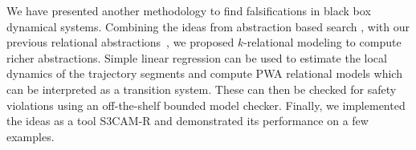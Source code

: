 
We have presented another methodology to find falsifications in black
box dynamical systems. Combining the ideas from abstraction based
search \cite{zutshi2014multiple}, with our previous relational
abstractions~\cite{zutshi2012timed}, we proposed $k$-relational
modeling to compute richer abstractions. Simple linear regression can
be used to estimate the local dynamics of the trajectory segments and
compute PWA relational models which can be interpreted as a transition
system.  These can then be checked for safety violations using an
off-the-shelf bounded model checker.  Finally, we implemented the
ideas as a tool S3CAM-R and demonstrated its performance on a few examples.








